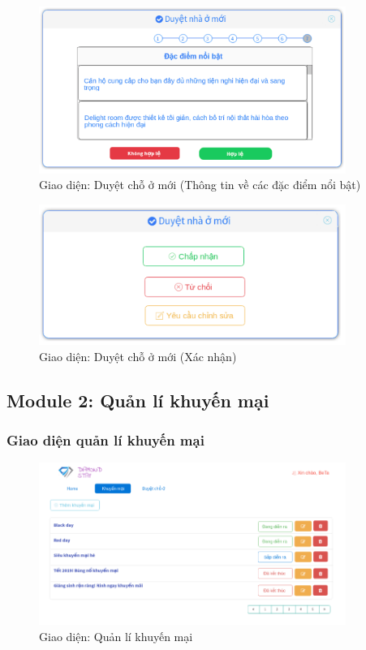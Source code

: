 \begin{figure}[H]
	\centering
	\includegraphics[width=10cm]{Image/uiTan7.png}
	\vspace{0.5cm}
	\caption{Giao diện: Duyệt chỗ ở mới (Thông tin về các đặc điểm nổi bật)}
\end{figure}

\begin{figure}[H]
	\centering
	\includegraphics[width=10cm]{Image/uiTan8.png}
	\vspace{0.5cm}
	\caption{Giao diện: Duyệt chỗ ở mới (Xác nhận)}
\end{figure}
\subsection{Module 2: Quản lí khuyến mại}
\subsubsection{Giao diện quản lí khuyến mại}
\begin{figure}[H]
	\centering
	\includegraphics[width=10cm]{Image/PromoManager.png}
	\vspace{0.5cm}
	\caption{Giao diện: Quản lí khuyến mại}
\end{figure}

